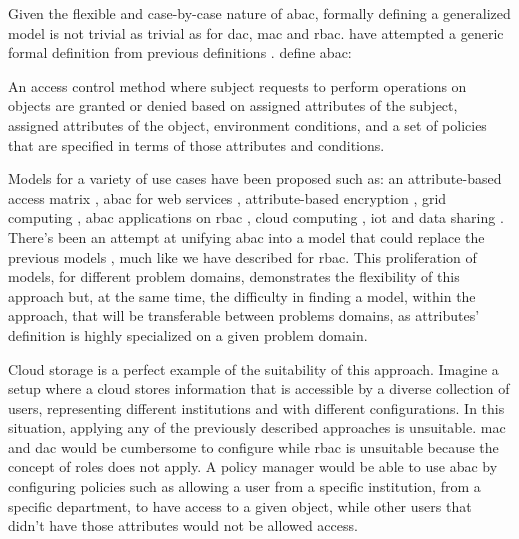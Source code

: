 Given the flexible and case-by-case nature of \gls{abac}, formally defining a generalized model is not trivial as trivial as for \gls{dac}, \gls{mac} and \gls{rbac}. \citeauthor{hu_guide_2014} \cite{hu_guide_2014} have attempted a generic formal definition from previous definitions \cite{wang_logic-based_2004, yuan_attributed_2005, cruz_constraint_2009}. \citeauthor{hu_guide_2014} \cite{hu_guide_2014} define \gls{abac}:

\begin{displayquote}
	An access control method where subject requests to perform operations on objects are granted or denied based on assigned attributes of the subject, assigned attributes of the object, environment conditions, and a set of policies that are specified in terms of those attributes and conditions.
\end{displayquote}

Models for a variety of use cases have been proposed such as: an attribute-based access matrix \cite{zhang_attribute-based_2005}, \gls{abac} for web services \cite{yuan_attributed_2005}, attribute-based encryption \cite{goyal_attribute-based_2006, wang_hierarchical_2010}, grid computing \cite{lang_flexible_2009}, \gls{abac} applications on \gls{rbac} \cite{kuhn_adding_2010}, cloud computing \cite{wan_hasbe:_2012, yang_attribute-based_2013}, \gls{iot} \cite{bhatt_access_2017, ouaddah_access_2017} and data sharing \cite{yu_attribute_2010}. There's been an attempt at unifying \gls{abac} into a model that could replace the previous models \cite{jin_unified_2012}, much like we have described for \gls{rbac}. This proliferation of models, for different problem domains, demonstrates the flexibility of this approach but, at the same time, the difficulty in finding a model, within the approach, that will be transferable between problems domains, as attributes' definition is highly specialized on a given problem domain.

Cloud storage is a perfect example of the suitability of this approach. Imagine a setup where a cloud stores information that is accessible by a diverse collection of users, representing different institutions and with different configurations. In this situation, applying any of the previously described approaches is unsuitable. \gls{mac} and \gls{dac} would be cumbersome to configure while \gls{rbac} is unsuitable because the concept of roles does not apply. A policy manager would be able to use \gls{abac} by configuring policies such as allowing a user from a specific institution, from a specific department, to have access to a given object, while other users that didn't have those attributes would not be allowed access.

